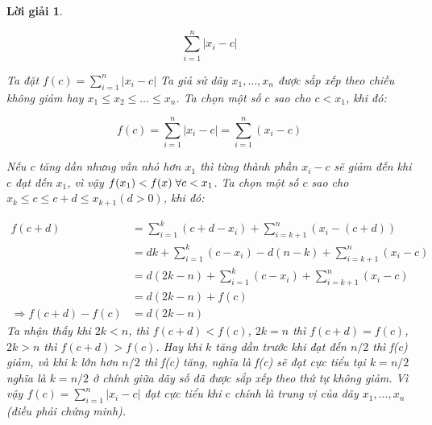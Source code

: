 \documentclass[14pt, a4paper]{article}
\theoremstyle{sltheorem}
\theoremstyle{soltheorem}
\newtheorem*{loigiai}{Lời giải}
\begin{document}
\begin{loigiai}
\begin{enumerate}[wide, labelwidth=!, labelindent=0pt,label=\textbf{\arabic*}.]
        \begin{equation*}
            \sum_{i=1}^n \lvert x_i - c \vert
        \end{equation*}

        Ta đặt $f(c) = \sum_{i=1}^n \lvert x_i - c \vert$
        Ta giả sử dãy $x_1, \dots, x_n$ được sắp xếp theo chiều không giảm hay $x_1 \leq x_2 \leq \dots \leq x_n$.
        Ta chọn một số $c$ sao cho $c < x_1$, khi đó:

        \begin{equation*}
            f(c) = \sum_{i=1}^n \lvert x_i - c \vert = \sum_{i=1}^n (x_i - c)
        \end{equation*}

        Nếu $c$ tăng dần nhưng vẫn nhỏ hơn $x_1$ thì từng thành phần $x_i - c$ sẽ giảm đến khi $c$ đạt đến $x_1$,
        vì vậy $f(x_1) < f(x) \thickspace \forall c < x_1$.
        Ta chọn một số $c$ sao cho $x_k \leq c \leq c + d \leq x_{k+1}(d > 0)$, khi đó:

        \begin{equation*}
            \begin{aligned}
                f(c + d) &= \sum_{i=1}^k (c + d - x_i) + \sum_{i=k+1}^n (x_i - (c + d)) \\
                &= dk + \sum_{i=1}^k (c - x_i) - d(n-k) + \sum_{i=k+1}^n (x_i - c) \\
                &= d(2k -n) + \sum_{i=1}^k (c - x_i) + \sum_{i=k+1}^n (x_i - c) \\
                &= d(2k - n) + f(c) \\
            \Rightarrow f(c + d) - f(c) &= d(2k - n)
            \end{aligned}
        \end{equation*}
        Ta nhận thấy khi $2k < n$, thì $f(c + d) < f(c)$, $2k = n$ thì $f(c+d)=f(c)$, $2k > n$ thì $f(c+d) > f(c)$.
        Hay khi $k$ tăng dần trước khi đạt đến $n/2$ thì f(c) giảm, và khi $k$ lớn hơn $n / 2$ thì f(c) tăng, nghĩa là f(c) sẽ đạt cực tiểu tại $k=n/2$ nghĩa là $k=n/2$ ở chính giữa dãy số đã được sắp xếp theo thứ tự không giảm.
        Vì vậy $f(c) = \sum_{i=1}^n \lvert x_i - c \vert$ đạt cực tiểu khi $c$ chính là trung vị của dãy $x_1, \dots, x_n$ (điều phải chứng minh).
    \end{enumerate}
\end{loigiai}

\newpage
\printbibliography[title={TÀI LIỆU THAM KHẢO}]
\end{document}
